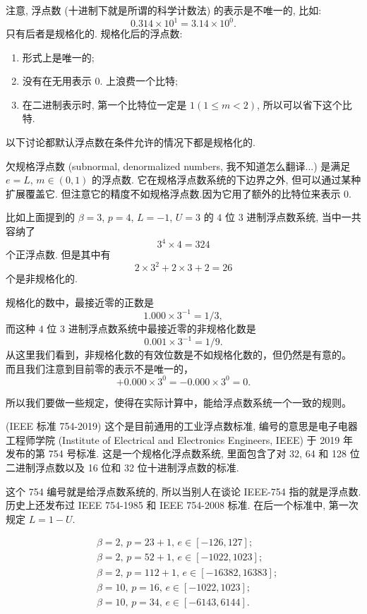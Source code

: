 \documentclass[a4paper]{ctexart}
\begin{document}
{注意, 浮点数 (十进制下就是所谓的科学计数法) 的表示是不唯一的, 比如:
$$
0.314 \times 10^1 = 3.14 \times 10^0.
$$
只有后者是规格化的. 规格化后的浮点数:
\begin{enumerate}
\item 形式上是唯一的; 
\item 没有在无用表示 $0.$ 上浪费一个比特;
\item 在二进制表示时, 第一个比特位一定是 $1(1 \leq m < 2)$,
  所以可以省下这个比特.
\end{enumerate}
以下讨论都默认浮点数在条件允许的情况下都是规格化的.

 欠规格浮点数 (subnormal, denormalized numbers,
我不知道怎么翻译...) 是满足 $e = L$, $m \in (0, 1)$ 的浮点数.
它在规格浮点数系统的下边界之外, 但可以通过某种扩展覆盖它.
但注意它的精度不如规格浮点数.因为它用了额外的比特位来表示 $0$.

比如上面提到的 $\beta = 3$, $p = 4$, $L = -1$, $U = 3$ 的 $4$ 位 $3$ 进制浮点数系统,
当中一共容纳了 
$$
3^4 \times 4 = 324
$$ 
个正浮点数. 但是其中有 
$$
2 \times 3^2 + 2 \times 3 + 2 = 26
$$ 
个是非规格化的. 

规格化的数中，最接近零的正数是
$$
1.000 \times 3^{-1} = 1/3,
$$
而这种 $4$ 位 $3$ 进制浮点数系统中最接近零的非规格化数是
$$
0.001 \times 3^{-1} = 1/9.
$$
从这里我们看到，非规格化数的有效位数是不如规格化数的，但仍然是有意的。
而且我们注意到目前零的表示不是唯一的，
$$
+0.000 \times 3^0 = -0.000 \times 3^0 = 0.
$$

所以我们要做一些规定，使得在实际计算中，能给浮点数系统一个一致的规则。

 (IEEE 标准 754-2019) 这个是目前通用的工业浮点数标准,
编号的意思是电子电器工程师学院
(Institute of Electrical and Electronics Engineers, IEEE) 于 2019 年发布的第
754 号标准. 这是一个规格化浮点数系统, 里面包含了对 32, 64 和 128 位二进制浮点数以及
16 位和 32 位十进制浮点数的标准.

这个 754 编号就是给浮点数系统的, 所以当别人在谈论 IEEE-754 指的就是浮点数.
历史上还发布过 IEEE 754-1985 和 IEEE 754-2008 标准.
在后一个标准中, 第一次规定 $L = 1 - U$.

\begin{align*}
  &\beta = 2, \, p = 23 + 1, \, e \in [-126, 127]; \\
  &\beta = 2, \, p = 52 + 1, \, e \in [-1022, 1023]; \\
  &\beta = 2, \, p = 112 + 1, \, e \in [-16382, 16383]; \\
  &\beta = 10, \, p = 16, \, e \in [-1022, 1023]; \\
  &\beta = 10, \, p = 34, \, e \in [-6143, 6144]. 
\end{align*}
  

}
\end{document}

